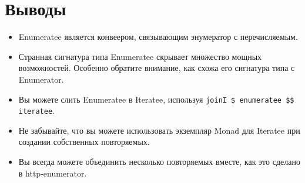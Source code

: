 \section{Выводы}

\begin{itemize}
\item Enumeratee является конвеером, связывающим энумератор с перечисляемым.
\item Странная сигнатура типа Enumeratee скрывает множество мощных возможностей. Особенно обратите внимание, как схожа его сигнатура типа с Enumerator.
\item Вы можете слить Enumeratee в Iteratee, используя \lstinline'joinI $ enumeratee $$ iteratee'.
\item Не забывайте, что вы можете использовать экземпляр Monad для Iteratee при создании собственных повторяемых.
\item Вы всегда можете объединить несколько повторяемых вместе, как это сделано в http-enumerator.
\end{itemize}

